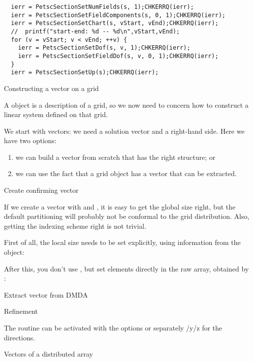 \begin{lstlisting}
  ierr = PetscSectionSetNumFields(s, 1);CHKERRQ(ierr);
  ierr = PetscSectionSetFieldComponents(s, 0, 1);CHKERRQ(ierr);
  ierr = PetscSectionSetChart(s, vStart, vEnd);CHKERRQ(ierr);
  //  printf("start-end: %d -- %d\n",vStart,vEnd);
  for (v = vStart; v < vEnd; ++v) {
    ierr = PetscSectionSetDof(s, v, 1);CHKERRQ(ierr);
    ierr = PetscSectionSetFieldDof(s, v, 0, 1);CHKERRQ(ierr);
  }
  ierr = PetscSectionSetUp(s);CHKERRQ(ierr);
\end{lstlisting}

 {Constructing a vector on a grid}

A  object is a description of a grid,
so we now need to concern how to construct a linear system
defined on that grid.

We start with vectors: we need a solution vector
and a right-hand side.
Here we have two options:
\begin{enumerate}
\item we can build a vector from scratch that has the right structure; or
\item we can use the fact that a grid object has a vector that can be extracted.
\end{enumerate}

 {Create confirming vector}

If we create a vector with  and ,
it is easy to get the global size right, but the default partitioning will
probably not be conformal to the grid distribution.
Also, getting the indexing scheme right is not trivial.

First of all, the local size needs to be set explicitly,
using information from the  object:
%

After this, you don't use , but
set elements directly in the raw array, obtained by :
%

 {Extract vector from DMDA}

 {Refinement}

The routine 
can be activated with the options 
or separately /y/z for the directions.

 {Vectors of a distributed array}

